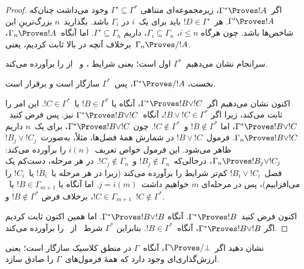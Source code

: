 \documentclass[../../../include/open-logic-section]{subfiles}
\begin{document}
\begin{proof}
  اگر~$\Gamma^* \Proves !A$، زیرمجموعه‌ای متناهی
  $\Gamma' \subseteq \Gamma^*$ وجود می‌داشت چنان‌که
  $\Gamma' \Proves !A$. هر~$!D \in \Gamma'$ باید برای یک~$i$ در
  $\Gamma_i$ باشد. بگذارید~$n$ بزرگ‌ترینِ این شاخص‌ها باشد. چون هرگاه
  $i \le n$، $\Gamma_i \subseteq \Gamma_n$، داریم
  $\Gamma' \subseteq \Gamma_n$. اما آنگاه~$\Gamma_n \Proves !A$،
  برخلاف آنچه در بالا ثابت کردیم، یعنی~$\Gamma_n \Proves/ !A$.

  سرانجام نشان می‌دهیم~$\Gamma^*$ اول است؛ یعنی شرایط
  ،  و~ از
   را برآورده می‌کند.

  نخست، $\Gamma^* \Proves/ !A$، پس~$\Gamma^*$ سازگار است و
   برقرار است.

  اکنون نشان می‌دهیم اگر~$\Gamma^* \Proves !B \lor !C$، آنگاه یا
  $!B \in \Gamma^*$ یا~$!C \in \Gamma^*$. این امر
   را ثابت می‌کند، زیرا اگر
  $!B \lor !C \in \Gamma^*$، آنگاه~$\Gamma^* \Proves !B \lor !C$ نیز.
  پس فرض کنید~$\Gamma^* \Proves !B \lor !C$، اما
  $!B \notin \Gamma^*$ و~$!C \notin \Gamma^*$. چون
  $\Gamma^* \Proves !B \lor !C$، برای یک~$n$ داریم
  $\Gamma_n \Proves !B \lor !C$. فرمول~$!B \lor !C$ در شمارش همهٔ
  فصل‌ها، مثلاً، به‌صورت~$!B_j \lor !C_j$ ظاهر می‌شود. این فرمول خواص
  تعریف~$i(n)$ را برآورده می‌کند: $\Gamma_n \Proves !B_j \lor !C_j$،
  درحالی‌که~$!B_j \notin \Gamma_n$ و~$!C_j \notin \Gamma_n$. در هر
  مرحله، دست‌کم یک فصل~$!B_i \lor !C_i$ کم‌تر شرایط را برآورده می‌کند
  (زیرا در هر مرحله یا~$!B_i$ یا~$!C_i$ را می‌افزاییم)، پس در مرحله‌ای
  $m$ خواهیم داشت~$j = i(m)$. اما آنگاه یا
  $!B \in \Gamma_{m+1}$ یا~$!C \in \Gamma_{m+1}$، برخلاف فرض
  $!B \notin \Gamma^*$ و~$!C \notin \Gamma^*$.

  اکنون فرض کنید~$\Gamma^* \Proves !B$. آنگاه
  $\Gamma^* \Proves !B \lor !B$. اما همین اکنون ثابت کردیم اگر
  $\Gamma^* \Proves !B \lor !B$، آنگاه~$!B \in \Gamma^*$. بنابراین
  $\Gamma^*$ شرط~ از~ را برآورده
  می‌کند.
\end{proof}

\begin{prob}
نشان دهید اگر~$\Gamma \Proves/ \bot$، آنگاه~$\Gamma$ در منطق کلاسیک
سازگار است؛ یعنی ارزش‌گذاری‌ای وجود دارد که همهٔ فرمول‌های~$\Gamma$ را
صادق سازد.
\end{prob}
\end{document}
